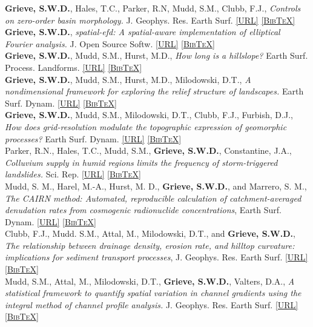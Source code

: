 \documentclass[10pt, a4paper]{article}
\newcommand{\doi}[1]{\href{https://dx.doi.org/#1}{\scriptsize\textsc{[URL]}}}
\newcommand{\bib}[1]{\href{https://www.doi2bib.org/bib/#1}{\scriptsize\textsc{[BibTeX]}}}
\newcommand{\paperlinks}[1]{\doi{#1} \bib{#1}}
\newcommand{\years}[1]{\marginnote{\scriptsize #1}}
\begin{document}
\years{2018}\textbf{Grieve, S.W.D.}, Hales, T.C., Parker, R.N, Mudd, S.M., Clubb, F.J., \textit{Controls on zero-order basin morphology.} J. Geophys. Res. Earth Surf. \paperlinks{10.1029/2017JF004453}\\[0.05cm]

\years{2017}\textbf{Grieve, S.W.D.}, \textit{spatial-efd: A spatial-aware implementation of elliptical Fourier analysis.} J. Open Source Softw. \paperlinks{10.21105/joss.00189}\\[0.05cm]

\years{2016}\textbf{Grieve, S.W.D.}, Mudd, S.M., Hurst, M.D., \textit{How long is a hillslope?} Earth Surf. Process. Landforms. \paperlinks{10.1002/esp.3884}\\[0.05cm]

\years{2016}\textbf{Grieve, S.W.D.}, Mudd, S.M., Hurst, M.D., Milodowski, D.T., \textit{A nondimensional framework for exploring the relief structure of landscapes.} Earth Surf. Dynam. \paperlinks{10.5194/esurf-4-309-2016}\\[0.05cm]

\years{2016}\textbf{Grieve, S.W.D.}, Mudd, S.M., Milodowski, D.T., Clubb, F.J., Furbish, D.J., \textit{How does grid-resolution modulate the topographic expression of geomorphic processes?} Earth Surf. Dynam. \paperlinks{10.5194/esurf-4-627-2016}\\[0.05cm]

\years{2016}Parker, R.N., Hales, T.C., Mudd, S.M., \textbf{Grieve, S.W.D.}, Constantine, J.A., \textit{Colluvium supply in humid regions limits the frequency of storm-triggered landslides.} Sci. Rep. \paperlinks{10.1038/srep34438}\\[0.05cm]

\years{2016}Mudd, S. M., Harel, M.-A., Hurst, M. D., \textbf{Grieve, S.W.D.}, and Marrero, S. M., \textit{The CAIRN method: Automated, reproducible calculation of catchment-averaged denudation rates from cosmogenic radionuclide concentrations}, Earth Surf. Dynam. \paperlinks{10.5194/esurf-4-655-2016}\\[0.05cm]

\years{2016}Clubb, F.J., Mudd. S.M., Attal, M., Milodowski, D.T., and \textbf{Grieve, S.W.D.}, \textit{The relationship between drainage density, erosion rate, and hilltop curvature: implications for sediment transport processes}, J. Geophys. Res. Earth Surf. \paperlinks{10.1002/2015JF003747}\\[0.05cm]

\years{2014}Mudd, S.M., Attal, M., Milodowski, D.T., \textbf{Grieve, S.W.D.}, Valters, D.A., \textit{A statistical framework to quantify spatial variation in channel gradients using the integral method of channel profile analysis.} J. Geophys. Res. Earth Surf. \paperlinks{10.1002/2013JF002981}\\[0.05cm]
\end{document}
